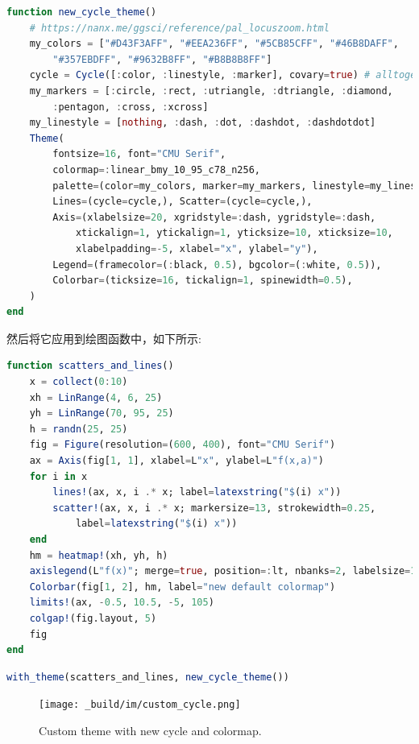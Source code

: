 \documentclass[
  notoc %
]{tufte-book}
\begin{document}
\begin{lstlisting}[language=Julia]
function new_cycle_theme()
    # https://nanx.me/ggsci/reference/pal_locuszoom.html
    my_colors = ["#D43F3AFF", "#EEA236FF", "#5CB85CFF", "#46B8DAFF",
        "#357EBDFF", "#9632B8FF", "#B8B8B8FF"]
    cycle = Cycle([:color, :linestyle, :marker], covary=true) # alltogether
    my_markers = [:circle, :rect, :utriangle, :dtriangle, :diamond,
        :pentagon, :cross, :xcross]
    my_linestyle = [nothing, :dash, :dot, :dashdot, :dashdotdot]
    Theme(
        fontsize=16, font="CMU Serif",
        colormap=:linear_bmy_10_95_c78_n256,
        palette=(color=my_colors, marker=my_markers, linestyle=my_linestyle),
        Lines=(cycle=cycle,), Scatter=(cycle=cycle,),
        Axis=(xlabelsize=20, xgridstyle=:dash, ygridstyle=:dash,
            xtickalign=1, ytickalign=1, yticksize=10, xticksize=10,
            xlabelpadding=-5, xlabel="x", ylabel="y"),
        Legend=(framecolor=(:black, 0.5), bgcolor=(:white, 0.5)),
        Colorbar=(ticksize=16, tickalign=1, spinewidth=0.5),
    )
end
\end{lstlisting}

然后将它应用到绘图函数中，如下所示:

\begin{lstlisting}[language=Julia]
function scatters_and_lines()
    x = collect(0:10)
    xh = LinRange(4, 6, 25)
    yh = LinRange(70, 95, 25)
    h = randn(25, 25)
    fig = Figure(resolution=(600, 400), font="CMU Serif")
    ax = Axis(fig[1, 1], xlabel=L"x", ylabel=L"f(x,a)")
    for i in x
        lines!(ax, x, i .* x; label=latexstring("$(i) x"))
        scatter!(ax, x, i .* x; markersize=13, strokewidth=0.25,
            label=latexstring("$(i) x"))
    end
    hm = heatmap!(xh, yh, h)
    axislegend(L"f(x)"; merge=true, position=:lt, nbanks=2, labelsize=14)
    Colorbar(fig[1, 2], hm, label="new default colormap")
    limits!(ax, -0.5, 10.5, -5, 105)
    colgap!(fig.layout, 5)
    fig
end
\end{lstlisting}

\begin{lstlisting}[language=Julia]
with_theme(scatters_and_lines, new_cycle_theme())
\end{lstlisting}

\begin{figure}
\hypertarget{fig:custom_cycle}{%
\centering
\texttt{[image: \_build/im/custom\_cycle.png]}
\caption{Custom theme with new cycle and
colormap.}\label{fig:custom_cycle}
}
\end{figure}
\end{document}
